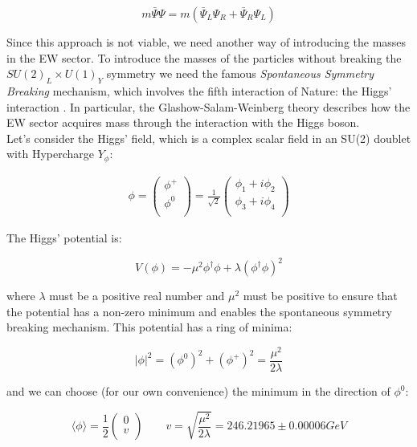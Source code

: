 \begin{equation}
    m \bar{\Psi} \Psi = m (\bar{\Psi}_L \Psi_R + \bar{\Psi}_R \Psi_L)
\end{equation}

Since this approach is not viable, we need another way of introducing the masses in the EW sector.
To introduce the masses of the particles without breaking the $SU(2)_L \times U(1)_Y$ symmetry
we need the famous \textit{Spontaneous Symmetry Breaking} mechanism, which involves the fifth interaction of 
Nature: the Higgs' interaction \cite{Higgs}.
In particular, the Glashow-Salam-Weinberg theory \cite{GLASHOW1961579, Weinberg, Salam} describes how the EW sector 
acquires mass through the interaction with the Higgs boson.\\

Let's consider the Higgs' field, which is a complex scalar field in an SU(2) doublet with Hypercharge $Y_{\phi}$:

\begin{align}
    \phi =
    \begin{pmatrix}
        \phi^+\\
        \phi^0 \\
    \end{pmatrix}
    = 
    \frac{1}{\sqrt{2}}
    \begin{pmatrix}
        \phi_1 + i \phi_2\\
        \phi_3 + i \phi_4\\
    \end{pmatrix}
\end{align}

The Higgs' potential is:

\begin{equation}
    V(\phi) = - \mu^2 \phi^{\dagger} \phi + \lambda (\phi^{\dagger} \phi)^2
\end{equation}

where $\lambda$ must be a positive real number and $\mu^2$ must be positive to ensure that the potential 
has a non-zero minimum and enables the spontaneous symmetry breaking mechanism.
This potential has a ring of minima:

\begin{equation}
    |\phi|^2 = (\phi^0)^2 + (\phi^+)^2 = \frac{\mu^2}{2 \lambda}
\end{equation}

and we can choose (for our own convenience) the minimum in the direction of $\phi^0$:

\begin{equation}
    \langle \phi \rangle = \frac{1}{2} \begin{pmatrix}
        0 \\
        v \\
    \end{pmatrix}
    \qquad
    v = \sqrt{\frac{\mu^2}{2 \lambda}} = 246.21965 \pm 0.00006 GeV
\end{equation}

